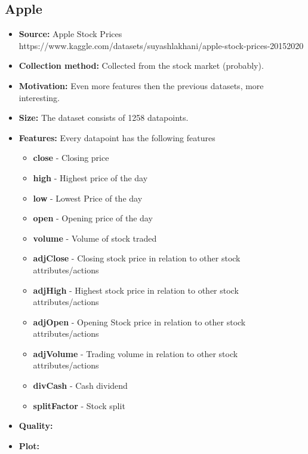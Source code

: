 \subsection{Apple}
\begin{itemize}
	\item \textbf{Source:} Apple Stock Prices \\ https://www.kaggle.com/datasets/suyashlakhani/apple-stock-prices-20152020
	\item \textbf{Collection method:} Collected from the stock market (probably).
	\item \textbf{Motivation:} Even more features then the previous datasets, more interesting.
	\item \textbf{Size:} The dataset consists of 1258 datapoints.
	\item \textbf{Features:} Every datapoint has the following features
	      \begin{itemize}
		      \item \textbf{close} - Closing price
		      \item \textbf{high} - Highest price of the day
		      \item \textbf{low} - Lowest Price of the day
		      \item \textbf{open} - Opening price of the day
		      \item \textbf{volume} - Volume of stock traded
		      \item \textbf{adjClose} - Closing stock price in relation to other stock attributes/actions
		      \item \textbf{adjHigh} - Highest stock price in relation to other stock attributes/actions
		      \item \textbf{adjOpen} - Opening Stock price in relation to other stock attributes/actions
		      \item \textbf{adjVolume} - Trading volume in relation to other stock attributes/actions
		      \item \textbf{divCash} - Cash dividend
		      \item \textbf{splitFactor} - Stock split
	      \end{itemize}
	\item \textbf{Quality:}
	\item \textbf{Plot:}
\end{itemize}
